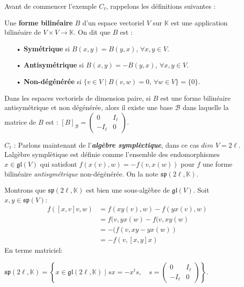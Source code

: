 \documentclass[a4paper,openany,12pt]{report}
\newcommand{\KK}{\mathbb{K}}
\newcommand{\gl}{\mathfrak{gl}}
\newcommand{\ssp}{\mathfrak{sp}}
\theoremstyle{break}
{\theorembodyfont{\upshape}
\newtheorem*{rmq}{Remarque :}
\newtheorem*{prv}{Preuve :}
\newtheorem*{ex}{Exemples :}
\newtheorem{exe}{Exemple : }
\newtheorem*{nota}{Notation :}}
\begin{document}
Avant de commencer l'exemple $ C_{\ell} $, rappelons les définitions suivantes :

\begin{df} 
\quad Une \textbf{forme bilinéaire} $B$ d'un espace vectoriel $V$ sur $\KK$ est une application bilinéaire de $V\times V\to  \KK$. 
On dit que $B$ est : 
\begin{itemize}
\item[•] \textbf{Symétrique} si $B(x,y)=B(y,x)$, $\forall x,y \in V$. 

\item[•] \textbf{Antisymétrique} si $B(x,y)=-B(y,x)$,  $\forall x,y \in V$. 

\item[•] \textbf{Non-dégénérée} si $\{ v \in V \mid B(v,w)=0$, $\forall w \in V \}= \{ 0 \}$.
\end{itemize}
\end{df}

\begin{rmq} 
\quad Dans  les espaces vectoriels de dimension paire, si $B$ est une forme bilinéaire antisymétrique et non dégénérée, alors il existe une base $\mathcal{B}$ dans laquelle la matrice de $B$ est : $[ B ]_\mathcal{B}=\begin{pmatrix} 0 & I_\ell \\ -I_\ell & 0 \end{pmatrix} $.
\end{rmq}

$ C_{\ell} $ : Parlons maintenant de l'\emph{\textbf{algèbre symplèctique}}, dans ce cas $dim$ $V=2 \ell$. Lalgèbre symplètique est définie comme l'ensemble des endomorphismes $x \in \gl(V)$ qui satisfont $f(x(v),w)=-f(v,x(w))$ pour $f$ une forme bilinéaire \textit{antisymétrique} non-dégénérée. On la note $\ssp (2\ell,\KK)$.

Montrons que $\ssp(2 \ell,\KK)$ est bien une sous-algèbre de $\gl(V)$. 
Soit $ x,y \in \ssp (V) $:
\begin{align*}
f([x,v]v ,w) &= f(xy(v),w)-f(yx(v),w) \\
           &= f(v,yx(w)-f(v,xy(w) \\
           &= -(f(v,xy-yx(w) )\\
           &=-f(v,[x,y]x)
\end{align*} 
En terme matriciel:

$\ssp (2 \ell,\KK)= \left \{ x\in \gl(2\ell,\KK) \mid sx=-x^ts, \quad s=\begin{pmatrix} 0 & I_\ell \\ -I_\ell & 0 \end{pmatrix} \right \}$.
\end{document}
